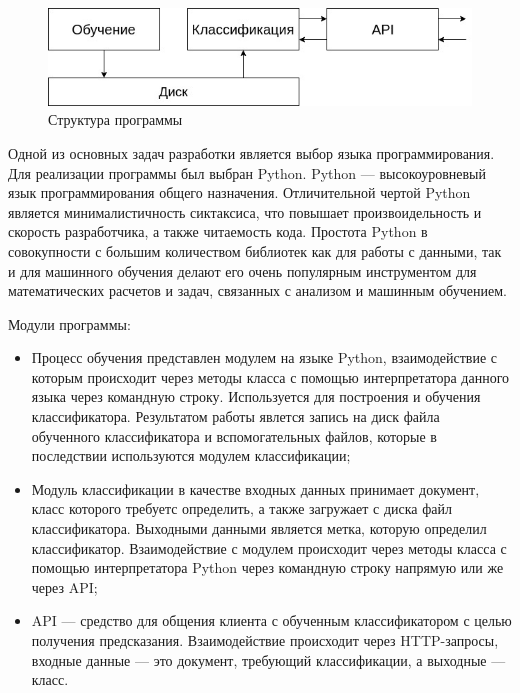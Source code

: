 \


  \begin{figure}[h!]
    \centering
    \setlength{\fboxsep}{5pt}
    \includegraphics[width=.9\textwidth]{img/module-structure}
    \vspace*{6pt}
    \caption{Структура программы}\label{fig:project-tree}
  \end{figure}


Одной из основных задач разработки является выбор языка программирования. Для реализации программы был выбран Python. Python — высокоуровневый язык программирования общего назначения. Отличительной чертой Python является минималистичность сиктаксиса, что повышает произвоидельность и скорость разработчика, а также читаемость кода.\cite{Python} Простота Python в совокупности с большим количеством библиотек как для работы с данными, так и для машинного обучения делают его очень популярным инструментом для математических расчетов и задач, связанных с анализом и машинным обучением.

Модули программы:

\begin{itemize}
  \item Процесс обучения представлен модулем на языке Python, взаимодействие с которым происходит через методы класса с помощью интерпретатора данного языка через командную строку. Используется для построения и обучения классификатора. Результатом работы явлется запись на диск файла обученного классификатора и вспомогательных файлов, которые в последствии используются модулем классификации;
  \item Модуль классификации в качестве входных данных принимает документ, класс которого требуетс определить, а также загружает с диска файл классификатора. Выходными данными является метка, которую определил классификатор. Взаимодействие с модулем происходит через методы класса с помощью интерпретатора Python через командную строку напрямую или же через API;
  \item API — средство для общения клиента с обученным классификатором с целью получения предсказания. Взаимодействие происходит через HTTP-запросы, входные данные — это документ, требующий классификации, а выходные — класс.
\end{itemize}

